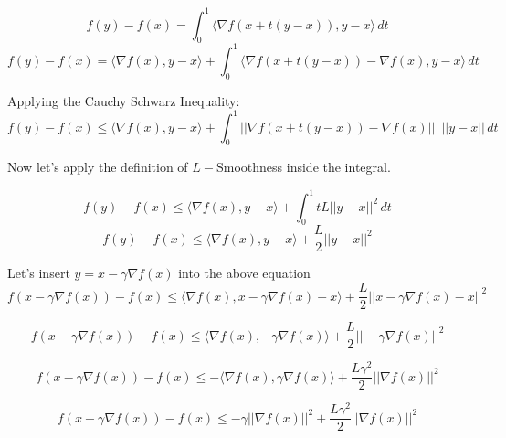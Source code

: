 \begin{equation}
    f(y) - f(x) = \int_{0}^{1} \langle \nabla f(x + t(y - x)), y - x \rangle \,dt
\end{equation}
\begin{equation}
    f(y) - f(x) = \langle \nabla f(x), y - x \rangle + \int_{0}^{1} \langle \nabla f(x + t(y - x)) - \nabla f(x), y - x \rangle \,dt
\end{equation} 


\noindent Applying the Cauchy Schwarz Inequality:
\begin{equation}
    f(y) - f(x) \leq \langle \nabla f(x), y - x \rangle + \int_{0}^{1} ||\nabla f(x + t(y - x)) - \nabla f(x)|| \enspace || y - x || \,dt
\end{equation}


\noindent Now let's apply the definition of $L-$Smoothness inside the integral.

\begin{equation}
    f(y) - f(x) \leq \langle \nabla f(x), y - x \rangle + \int_{0}^{1} tL ||y - x||^2\,dt
\end{equation}
\begin{equation}
    f(y) - f(x) \leq \langle \nabla f(x), y - x \rangle + \frac{L}{2} ||y - x||^2
\end{equation}

\noindent Let's insert $y = x - \gamma \nabla f(x)$ into the above equation \newline 
\begin{equation}
    f(x - \gamma \nabla f(x)) - f(x) \leq \langle \nabla f(x), x - \gamma \nabla f(x) - x \rangle + \frac{L}{2} ||x - \gamma \nabla f(x) - x||^2
\end{equation}

\begin{equation}
    f(x - \gamma \nabla f(x)) - f(x) \leq \langle \nabla f(x), - \gamma \nabla f(x) \rangle + \frac{L}{2} ||- \gamma \nabla f(x)||^2
\end{equation}

\begin{equation}
    f(x - \gamma \nabla f(x)) - f(x) \leq - \langle \nabla f(x), \gamma \nabla f(x) \rangle + \frac{L\gamma ^2}{2} ||\nabla f(x)||^2
\end{equation}

\begin{equation}
    f(x - \gamma \nabla f(x)) - f(x) \leq - \gamma ||\nabla f(x)||^2 + \frac{L\gamma ^2}{2} ||\nabla f(x)||^2
\end{equation}

